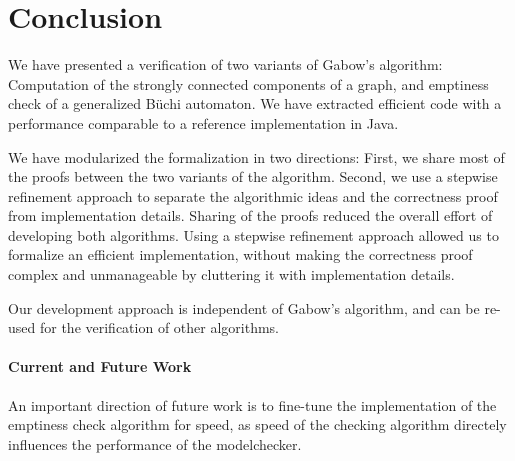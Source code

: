 \section{Conclusion}\label{sec:concl}
  We have presented a verification of two variants of Gabow's algorithm: Computation of the strongly connected components of
  a graph, and emptiness check of a generalized B\"uchi automaton. We have extracted efficient code with a performance comparable to a
  reference implementation in Java.
  
  We have modularized the formalization in two directions: First, we share most of the proofs between the two variants of the algorithm. Second,
  we use a stepwise refinement approach to separate the algorithmic ideas and the correctness proof from implementation details.
  Sharing of the proofs reduced the overall effort of developing both algorithms. Using a stepwise refinement approach allowed us to
  formalize an efficient implementation, without making the correctness proof complex and unmanageable by cluttering it with implementation details.

  Our development approach is independent of Gabow's algorithm, and can be re-used for the verification of other algorithms.

  \paragraph{Current and Future Work} 
  An important direction of future work is to fine-tune the implementation of 
  the emptiness check algorithm for speed, as speed of the checking algorithm
  directely influences the performance of the modelchecker.
